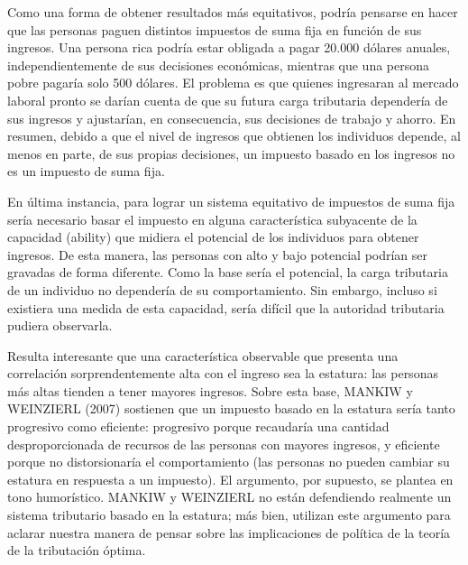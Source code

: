 \documentclass[10pt,a4paper]{article}
\begin{document}
Como una forma de obtener resultados más equitativos, podría pensarse en hacer que las personas paguen distintos impuestos de suma fija en función de sus ingresos. Una persona rica podría estar obligada a pagar 20.000 dólares anuales, independientemente de sus decisiones económicas, mientras que una persona pobre pagaría solo 500 dólares. El problema es que quienes ingresaran al mercado laboral pronto se darían cuenta de que su futura carga tributaria dependería de sus ingresos y ajustarían, en consecuencia, sus decisiones de trabajo y ahorro. En resumen, debido a que el nivel de ingresos que obtienen los individuos depende, al menos en parte, de sus propias decisiones, un impuesto basado en los ingresos no es un impuesto de suma fija.

En última instancia, para lograr un sistema equitativo de impuestos de suma fija sería necesario basar el impuesto en alguna característica subyacente de la capacidad (ability) que midiera el potencial de los individuos para obtener ingresos. De esta manera, las personas con alto y bajo potencial podrían ser gravadas de forma diferente. Como la base sería el potencial, la carga tributaria de un individuo no dependería de su comportamiento. Sin embargo, incluso si existiera una medida de esta capacidad, sería difícil que la autoridad tributaria pudiera observarla.

Resulta interesante que una característica observable que presenta una correlación sorprendentemente alta con el ingreso sea la estatura: las personas más altas tienden a tener mayores ingresos. Sobre esta base, MANKIW y WEINZIERL (2007) sostienen que un impuesto basado en la estatura sería tanto progresivo como eficiente: progresivo porque recaudaría una cantidad desproporcionada de recursos de las personas con mayores ingresos, y eficiente porque no distorsionaría el comportamiento (las personas no pueden cambiar su estatura en respuesta a un impuesto). El argumento, por supuesto, se plantea en tono humorístico. MANKIW y WEINZIERL no están defendiendo realmente un sistema tributario basado en la estatura; más bien, utilizan este argumento para aclarar nuestra manera de pensar sobre las implicaciones de política de la teoría de la tributación óptima.
\end{document}

